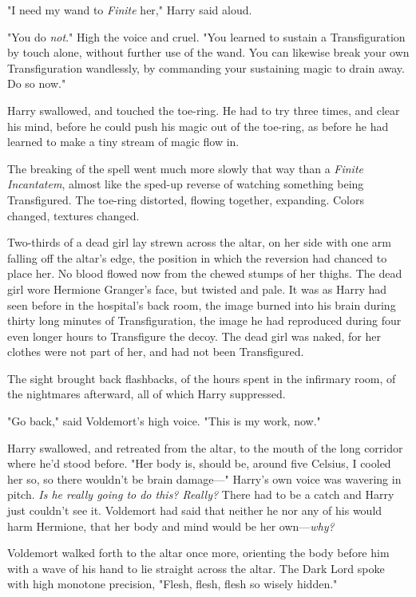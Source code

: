 "I need my wand to \emph{Finite} her," Harry said aloud.

"You do \emph{not}." High the voice and cruel. "You learned to sustain a
Transfiguration by touch alone, without further use of the wand. You can
likewise break your own Transfiguration wandlessly, by commanding your
sustaining magic to drain away. Do so now."

Harry swallowed, and touched the toe-ring. He had to try three times, and clear
his mind, before he could push his magic out of the toe-ring, as before he had
learned to make a tiny stream of magic flow in.

The breaking of the spell went much more slowly that way than a \emph{Finite
Incantatem}, almost like the sped-up reverse of watching something being
Transfigured. The toe-ring distorted, flowing together, expanding. Colors
changed, textures changed.

Two-thirds of a dead girl lay strewn across the altar, on her side with one arm
falling off the altar's edge, the position in which the reversion had chanced
to place her. No blood flowed now from the chewed stumps of her thighs. The
dead girl wore Hermione Granger's face, but twisted and pale. It was as Harry
had seen before in the hospital's back room, the image burned into his brain
during thirty long minutes of Transfiguration, the image he had reproduced
during four even longer hours to Transfigure the decoy. The dead girl was
naked, for her clothes were not part of her, and had not been Transfigured.

The sight brought back flashbacks, of the hours spent in the infirmary room, of
the nightmares afterward, all of which Harry suppressed.

"Go back," said Voldemort's high voice. "This is my work, now."

Harry swallowed, and retreated from the altar, to the mouth of the long
corridor where he'd stood before. "Her body is, should be, around five Celsius,
I cooled her so, so there wouldn't be brain damage\mbox{---}" Harry's own voice was
wavering in pitch. \emph{Is he really going to do this? Really?} There had to
be a catch and Harry just couldn't see it. Voldemort had said that neither he
nor any of his would harm Hermione, that her body and mind would be her
own---\emph{why?}

Voldemort walked forth to the altar once more, orienting the body before him
with a wave of his hand to lie straight across the altar. The Dark Lord spoke
with high monotone precision, "Flesh, flesh, flesh so wisely hidden."

